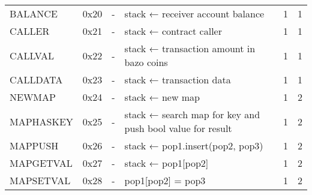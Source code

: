 \begin{longtable}[c]{L{2.5cm} L{1cm} L{3cm} L{5.5cm} R{0.8cm} R{1cm} }
BALANCE   & 0x20   & -                                                                                                        & stack ← receiver account balance                                                                            & 1         & 1          \\
CALLER    & 0x21   & -                                                                                                        & stack ← contract caller                                                                                     & 1         & 1          \\
CALLVAL   & 0x22   & -                                                                                                        & stack ← transaction amount in bazo coins                                                                    & 1         & 1          \\
CALLDATA  & 0x23   & -                                                                                                        & stack ← transaction data                                                                                    & 1         & 1          \\
NEWMAP    & 0x24   & -                                                                                                        & stack ← new map                                                                                             & 1         & 2          \\
MAPHASKEY  & 0x25   & -                                                                                                        & stack ← search map for key and push bool value for result                             & 1         & 2          \\
MAPPUSH   & 0x26   & -                                                                                                        & stack ← pop1.insert(pop2, pop3)                                                                       & 1         & 2          \\
MAPGETVAL & 0x27   & -                                                                                                        & stack ← pop1[pop2]                                                                                    & 1         & 2          \\
MAPSETVAL & 0x28   & -                                                                                                        & pop1[pop2] = pop3                                                                                            & 1         & 2          \\

\end{longtable}
